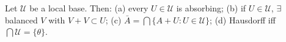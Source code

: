 Let $\mathcal{U}$ be a local base. Then: (a) every $U\in\mathcal{U}$ is absorbing; (b) if $U\in\mathcal{U}$, $\exists$ balanced $V$ with $V+V\subset U$; (c) $\bar{A}=\bigcap\{A+U:U\in\mathcal{U}\}$; (d) Hausdorff iff $\bigcap\mathcal{U}=\{\theta\}$.
